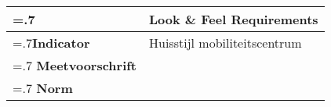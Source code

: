 \noindent
\begin{longtable}{|>{\raggedleft\hsize=.7\hsize\bfseries}X|
    >{\arraybackslash\hsize=1.3\hsize}X|} \hline
\multicolumn{1}{|l|}{\textbf{NFR}} & Look \& Feel Requirements\\ \hline
Indicator & Huisstijl mobiliteitscentrum \\  \hline
Meetvoorschrift & \\ \hline
Norm & \\ \hline
\end{longtable}